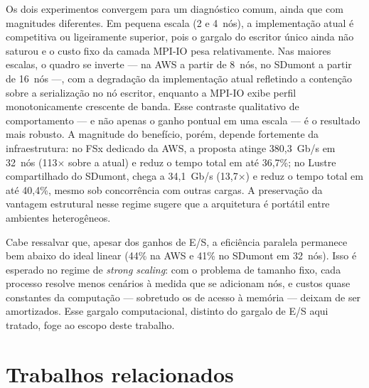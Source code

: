\documentclass[12pt]{article}
\begin{document}
Os dois experimentos convergem para um diagnóstico comum, ainda que com magnitudes diferentes. Em pequena escala (2 e 4~nós), a implementação atual é competitiva ou ligeiramente superior, pois o gargalo do escritor único ainda não saturou e o custo fixo da camada MPI-IO pesa relativamente. Nas maiores escalas, o quadro se inverte --- na AWS a partir de 8~nós, no SDumont a partir de 16~nós ---, com a degradação da implementação atual refletindo a contenção sobre a serialização no nó escritor, enquanto a MPI-IO exibe perfil monotonicamente crescente de banda. Esse contraste qualitativo de comportamento --- e não apenas o ganho pontual em uma escala --- é o resultado mais robusto. A magnitude do benefício, porém, depende fortemente da infraestrutura: no FSx dedicado da AWS, a proposta atinge 380,3~Gb/s em 32~nós (113$\times$ sobre a atual) e reduz o tempo total em até 36,7\%; no Lustre compartilhado do SDumont, chega a 34,1~Gb/s (13,7$\times$) e reduz o tempo total em até 40,4\%, mesmo sob concorrência com outras cargas. A preservação da vantagem estrutural nesse regime sugere que a arquitetura é portátil entre ambientes heterogêneos.

Cabe ressalvar que, apesar dos ganhos de E/S, a eficiência paralela permanece bem abaixo do ideal linear (44\% na AWS e 41\% no SDumont em 32~nós). Isso é esperado no regime de \textit{strong scaling}: com o problema de tamanho fixo, cada processo resolve menos cenários à medida que se adicionam nós, e custos quase constantes da computação --- sobretudo os de acesso à memória --- deixam de ser amortizados. Esse gargalo computacional, distinto do gargalo de E/S aqui tratado, foge ao escopo deste trabalho.

\section{Trabalhos relacionados}~\label{sec:relacionados}
\end{document}
